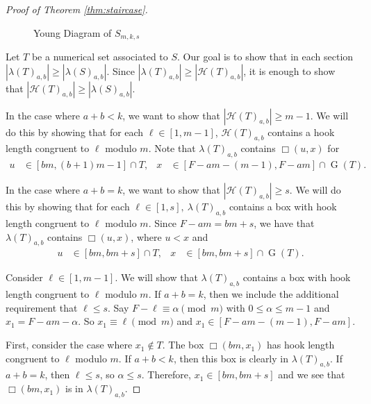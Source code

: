 \documentclass{amsproc}
\DeclareMathOperator{\G}{G}
\theoremstyle{definition}
\theoremstyle{remark}
\numberwithin{equation}{section}
\begin{document}
\begin{proof}[Proof of Theorem \ref{thm:staircase}]
\begin{center}
\begin{figure}
\caption{Young Diagram of $S_{m,k,s}$}
\end{figure}
    \end{center}

Let $T$ be a numerical set associated to $S$.
Our goal is to show that in each section $|\lambda(T)_{a,b}| \ge |\lambda(S)_{a,b}|$. Since $|\lambda(T)_{a,b}| \ge |\mathcal{H}(T)_{a,b}|$, it is enough to show that $|\mathcal{H}(T)_{a,b}| \ge |\lambda(S)_{a,b}|$.

In the case where $a+b<k$, we want to show that $|\mathcal{H}(T)_{a,b}|\geq m-1$. We will do this by showing that for each $\ell\in [1,m-1]$, $\mathcal{H}(T)_{a,b}$ contains a hook length congruent to $\ell$ modulo $m$.
Note that $\lambda(T)_{a,b}$ contains $\Box(u,x)$ for
\begin{align*}
u & \in [bm,(b+1)m-1]\cap T,
&
x & \in [F-am-(m-1),F-am]\cap \G(T).
\end{align*}

In the case where $a+b=k$, we want to show that $|\mathcal{H}(T)_{a,b}|\geq s$. We will do this by showing that for each $\ell \in [1,s],\ \lambda(T)_{a,b}$ contains a box with hook length congruent to $\ell$ modulo $m$.
Since $F-am=bm+s$, we have that $\lambda(T)_{a,b}$ contains $\Box(u,x)$, where $u<x$ and
\begin{align*}
u & \in  [bm,bm+s]\cap T,
&
x & \in [bm,bm+s]\cap \G(T).
\end{align*}

    Consider $\ell\in [1,m-1]$. We will show that $\lambda(T)_{a,b}$ contains a box with hook length congruent to $\ell$ modulo $m$. If $a+b=k$, then we include the additional requirement that $\ell \leq s$.
    Say $F-\ell\equiv \alpha \pmod{m}$ with $0\leq \alpha\leq m-1$ and $x_1=F-am-\alpha$. So $x_1\equiv \ell \pmod{m}$ and $x_1\in [F-am-(m-1),F-am]$.
    
    First, consider the case where $x_1\notin T$. The box $\Box(bm,x_1)$ has hook length congruent to $\ell$ modulo $m$.
    If $a+b<k$, then this box is clearly in $\lambda(T)_{a,b}$.  If $a+b=k$, then $\ell\leq s$, so $\alpha\leq s$. Therefore, $x_1\in [bm,bm+s]$ and we see that $\Box(bm,x_1)$ is in $\lambda(T)_{a,b}$.
    

\end{proof}
\end{document}
